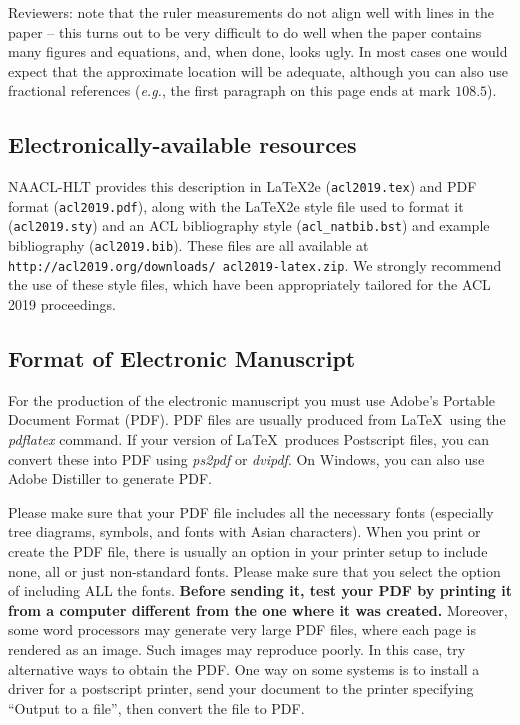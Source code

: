 \documentclass[11pt,a4paper]{article}
\begin{document}
Reviewers: note that the ruler measurements do not align well with
lines in the paper -- this turns out to be very difficult to do well
when the paper contains many figures and equations, and, when done,
looks ugly. In most cases one would expect that the approximate
location will be adequate, although you can also use fractional
references ({\em e.g.}, the first paragraph on this page ends at mark $108.5$).

\subsection{Electronically-available resources}

NAACL-HLT provides this description in \LaTeX2e{} ({\small\tt acl2019.tex}) and PDF
format ({\small\tt acl2019.pdf}), along with the \LaTeX2e{} style file used to
format it ({\small\tt acl2019.sty}) and an ACL bibliography style ({\small\tt acl\_natbib.bst})
and example bibliography ({\small\tt acl2019.bib}).
These files are all available at
{\small\tt http://acl2019.org/downloads/ acl2019-latex.zip}. 
 We
strongly recommend the use of these style files, which have been
appropriately tailored for the ACL 2019 proceedings.

\subsection{Format of Electronic Manuscript}
\label{sect:pdf}

For the production of the electronic manuscript you must use Adobe's
Portable Document Format (PDF). PDF files are usually produced from
\LaTeX\ using the \textit{pdflatex} command. If your version of
\LaTeX\ produces Postscript files, you can convert these into PDF
using \textit{ps2pdf} or \textit{dvipdf}. On Windows, you can also use
Adobe Distiller to generate PDF.

Please make sure that your PDF file includes all the necessary fonts
(especially tree diagrams, symbols, and fonts with Asian
characters). When you print or create the PDF file, there is usually
an option in your printer setup to include none, all or just
non-standard fonts.  Please make sure that you select the option of
including ALL the fonts. \textbf{Before sending it, test your PDF by
  printing it from a computer different from the one where it was
  created.} Moreover, some word processors may generate very large PDF
files, where each page is rendered as an image. Such images may
reproduce poorly. In this case, try alternative ways to obtain the
PDF. One way on some systems is to install a driver for a postscript
printer, send your document to the printer specifying ``Output to a
file'', then convert the file to PDF.
\end{document}
